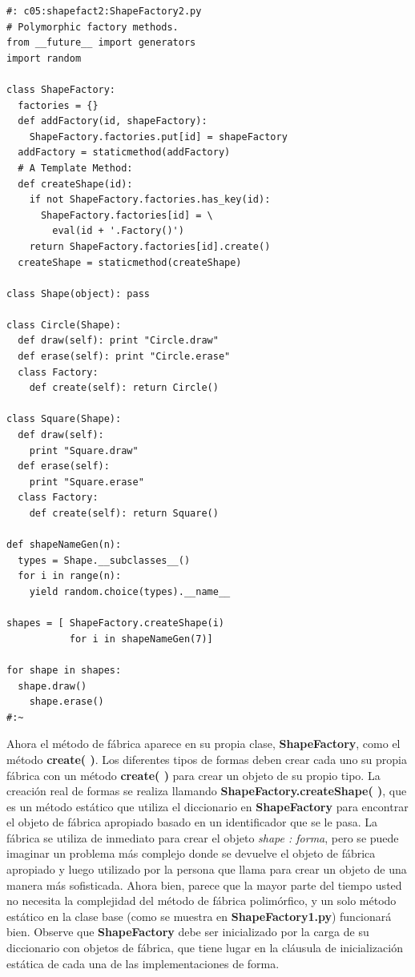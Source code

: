 \documentclass{article}
\begin{document}
\begin{lstlisting} 
#: c05:shapefact2:ShapeFactory2.py 
# Polymorphic factory methods. 
from __future__ import generators 
import random 

class ShapeFactory: 
  factories = {} 
  def addFactory(id, shapeFactory): 
    ShapeFactory.factories.put[id] = shapeFactory 
  addFactory = staticmethod(addFactory) 
  # A Template Method: 
  def createShape(id): 
    if not ShapeFactory.factories.has_key(id): 
      ShapeFactory.factories[id] = \ 
        eval(id + '.Factory()') 
    return ShapeFactory.factories[id].create() 
  createShape = staticmethod(createShape) 
  
class Shape(object): pass 

class Circle(Shape): 
  def draw(self): print "Circle.draw"  
  def erase(self): print "Circle.erase" 
  class Factory: 
    def create(self): return Circle()  
    
class Square(Shape): 
  def draw(self):  
    print "Square.draw"  
  def erase(self):  
    print "Square.erase"  
  class Factory: 
    def create(self): return Square() 
    
def shapeNameGen(n): 
  types = Shape.__subclasses__() 
  for i in range(n): 
    yield random.choice(types).__name__ 
    
shapes = [ ShapeFactory.createShape(i)  
           for i in shapeNameGen(7)] 
           
for shape in shapes: 
  shape.draw() 
    shape.erase() 
#:~ 
\end{lstlisting}
Ahora el método de fábrica aparece en su propia clase, \textbf{ShapeFactory}, como el método \textbf{create( )}. Los diferentes tipos de formas deben crear cada uno su propia fábrica con un método \textbf{create( )} para crear un objeto de su propio tipo. La creación real de formas se realiza llamando \textbf{ShapeFactory.createShape( )}, que es un método estático que utiliza el diccionario en \textbf{ShapeFactory} para encontrar el objeto de fábrica apropiado basado en un identificador que se le pasa. La fábrica se utiliza de inmediato para crear el objeto \textit{shape : forma}, pero se puede imaginar un problema más complejo donde se devuelve el objeto de fábrica apropiado y luego utilizado por la persona que llama para crear un objeto de una manera más sofisticada. Ahora bien, parece que la mayor parte del tiempo usted no necesita la complejidad del método de fábrica polimórfico, y un solo método estático en la clase base (como se muestra en \textbf{ShapeFactory1.py}) funcionará bien. Observe que \textbf{ShapeFactory} debe ser inicializado por la carga de su diccionario con objetos de fábrica, que tiene lugar en la cláusula de inicialización estática de cada una de las implementaciones de forma.   \newline
\end{document}
